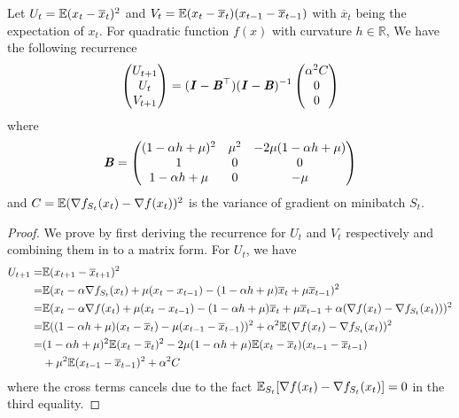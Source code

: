 \begin{lemma}
\label{lem:var_rec}
	Let $U_t=\mathbb{E} ( x_t - \overline{x}_t ) ^2$ and $V_t= \mathbb{E} (x_t - \overline{x}_t)(x_{t-1} - \overline{x}_{t-1})$ with $\overline{x}_t$ being the expectation of $x_t$. For quadratic function $f(x)$ with curvature $h \in \mathbb{R}$, We have the following recurrence
		\begin{equation} 
		\begin{pmatrix}
			U_{t+1} \\
			U_t \\
			V_{t + 1}
		\end{pmatrix} = 
		(\bm{\mathit{I}} - \bm{\mathit{B}}^{\top})(\bm{\mathit{I}} - \bm{\mathit{B}})^{-1}
		\begin{pmatrix}
			\alpha^2 C \\
			0 \\
			0
		\end{pmatrix}
	\end{equation}
	where 
	\begin{equation}
		\bm{\mathit{B}} = 
		\begin{pmatrix}
		(1-\alpha h + \mu)^2 &  \mu^2 & -2\mu(1-\alpha h + \mu)\\
		1 & 0 & 0 \\
		1-\alpha h + \mu & 0 & - \mu
		\end{pmatrix}
	\end{equation}
	and $C = \mathbb{E} ( \nabla f_{S_t}(x_t) - \nabla f(x_t) )^2$ is the variance of gradient on minibatch $S_t$.
	
	\begin{proof}
		We prove by first deriving the recurrence for $U_t$ and $V_t$ respectively and combining them in to a matrix form. For $U_t$, we have
		\begin{equation}
		\begin{aligned}
			U_{t + 1} = & \mathbb{E} ( x_{t+1} - \overline{x}_{t + 1} )^2\\
			 = & \mathbb{E} ( x_{t} - \alpha \nabla f_{S_t}(x_t) + \mu (x_{t} - x_{t - 1} ) - (1 - \alpha h + \mu) \overline{x}_t + \mu \overline{x}_{t - 1} )^2 \\
			 = & \mathbb{E} ( x_{t} - \alpha \nabla f(x_t) + \mu (x_{t} - x_{t - 1} ) - (1 - \alpha h + \mu) \overline{x}_t + \mu \overline{x}_{t - 1}  + \alpha (\nabla f(x_t) - \nabla f_{S_t}(x_t)) )^2 \\
			 = & \mathbb{E} ( (1 - \alpha h + \mu) (x_t - \overline{x}_t)  - \mu(x_{t - 1} - \overline{x}_{t - 1} ) )^2 + \alpha^2 \mathbb{E} ( \nabla f(x_t) - \nabla f_{S_t}(x_t) )^2 \\
			 = & (1 - \alpha h + \mu)^2 \mathbb{E} ( x_t - \overline{x}_t )^2 -2 \mu (1 - \alpha h + \mu) \mathbb{E} (x_t - \overline{x}_t)(x_{t - 1} - \overline{x}_{t - 1} ) \\
			 & + \mu^2\mathbb{E} ( x_{t-1} - \overline{x}_{t-1} )^2+ \alpha^2 C
		\end{aligned}
		\label{equ:U_term}
		\end{equation}
		where the cross terms cancels due to the fact $\mathbb{E}_{S_t} [\nabla f(x_t) - \nabla f_{S_t}(x_t)]=0$ in the third equality. 
		

\end{proof}
\end{lemma}
